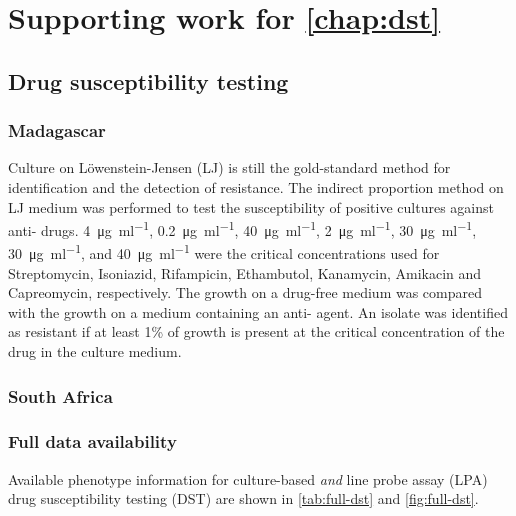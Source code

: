 \chapter{Supporting work for \autoref*{chap:dst}}

\section{Drug susceptibility testing}
\label{app:dst-ext-methods}
\subsection{Madagascar}

Culture on Löwenstein-Jensen (LJ) is still the gold-standard method for \mtb{} identification and the detection of resistance. The indirect proportion method on LJ medium was performed to test the susceptibility of positive cultures against anti-\mtb{} drugs. \SI{4}{\ug\per\ml}, \SI{0.2}{\ug\per\ml}, \SI{40}{\ug\per\ml}, \SI{2}{\ug\per\ml}, \SI{30}{\ug\per\ml}, \SI{30}{\ug\per\ml}, and \SI{40}{\ug\per\ml} were the critical concentrations used for Streptomycin, Isoniazid, Rifampicin, Ethambutol, Kanamycin, Amikacin and Capreomycin, respectively. The growth on a drug-free medium was compared with the growth on a medium containing an anti-\mtb{} agent. An isolate was identified as resistant if at least 1\% of growth is present at the critical concentration of the drug in the culture medium.  

\subsection{South Africa}


\subsection{Full data availability}
\label{app:full-dst}

Available phenotype information for culture-based \emph{and} line probe assay (LPA) drug susceptibility testing (DST) are shown in \autoref{tab:full-dst} and \autoref{fig:full-dst}.

